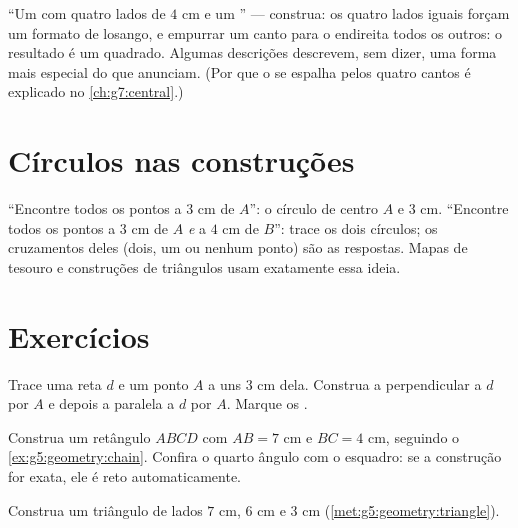 \begin{example}\label{ex:g5:geometry:recognize}
``Um  com quatro lados de $4$ cm e um '' ---
construa: os quatro lados iguais forçam um formato de losango, e
empurrar um canto para o  endireita todos os outros: o
resultado é um quadrado. Algumas descrições descrevem, sem dizer, uma
forma mais especial do que anunciam. (Por que o  se
espalha pelos quatro cantos é explicado no \cref{ch:g7:central}.)
\end{example}

\section{Círculos nas construções}

\begin{example}\label{ex:g5:geometry:circle}
``Encontre todos os pontos a $3$ cm de $A$'': o círculo de centro $A$
e  $3$ cm. ``Encontre todos os pontos a $3$ cm de $A$ \emph{e} a
$4$ cm de $B$'': trace os dois círculos; os cruzamentos deles (dois,
um ou nenhum ponto) são as respostas. Mapas de tesouro e construções
de triângulos usam exatamente essa ideia.
\end{example}

\section{Exercícios}

\begin{exercise}[$\star$]\label{exo:g5:geometry:1}
Trace uma reta $d$ e um ponto $A$ a uns $3$ cm dela. Construa a
perpendicular a $d$ por $A$ e depois a paralela a $d$ por $A$. Marque
os .
\end{exercise}

\begin{exercise}[$\star$]\label{exo:g5:geometry:2}
Construa um retângulo $ABCD$ com $AB = 7$ cm e $BC = 4$ cm, seguindo
o \cref{ex:g5:geometry:chain}. Confira o quarto ângulo com o
esquadro: se a construção for exata, ele é reto automaticamente.
\end{exercise}

\begin{exercise}[$\star$]\label{exo:g5:geometry:3}
Construa um triângulo de lados $7$ cm, $6$ cm e $3$ cm
(\cref{met:g5:geometry:triangle}).
\end{exercise}

